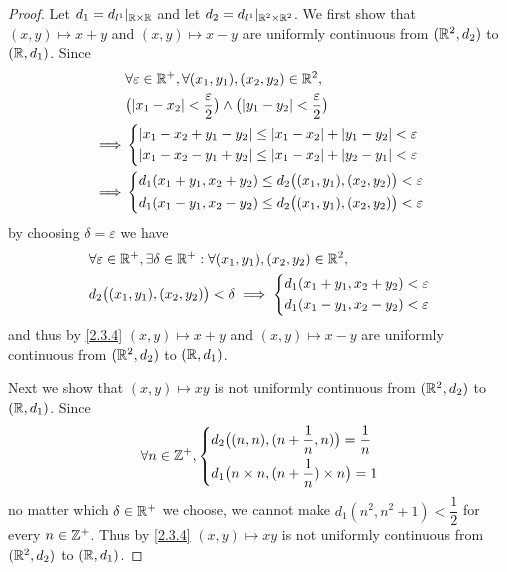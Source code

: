 \begin{proof}
  Let \(d_1 = d_{l^1}|_{\mathbb{R} \times \mathbb{R}}\) and let \(d_2 = d_{l^1}|_{\mathbb{R}^2 \times \mathbb{R}^2}\).
  We first show that \((x, y) \mapsto x + y\) and \((x, y) \mapsto x - y\) are uniformly continuous from \((\mathbb{R}^2, d_2)\) to \((\mathbb{R}, d_1)\).
  Since
  \begin{align*}
             & \forall \varepsilon \in \R^+, \forall (x_1, y_1), (x_2, y_2) \in \R^2,                                      \\
             & \big(\abs{x_1 - x_2} < \dfrac{\varepsilon}{2}\big) \land \big(\abs{y_1 - y_2} < \dfrac{\varepsilon}{2}\big) \\
    \implies & \begin{dcases}
                 \abs{x_1 - x_2 + y_1 - y_2} \leq \abs{x_1 - x_2} + \abs{y_1 - y_2} < \varepsilon \\
                 \abs{x_1 - x_2 - y_1 + y_2} \leq \abs{x_1 - x_2} + \abs{y_2 - y_1} < \varepsilon \\
               \end{dcases}                            \\
    \implies & \begin{dcases}
                 d_1(x_1 + y_1, x_2 + y_2) \leq d_2\big((x_1, y_1), (x_2, y_2)\big) < \varepsilon \\
                 d_1(x_1 - y_1, x_2 - y_2) \leq d_2\big((x_1, y_1), (x_2, y_2)\big) < \varepsilon
               \end{dcases}
  \end{align*}
  by choosing \(\delta = \varepsilon\) we have
  \begin{align*}
     & \forall \varepsilon \in \mathbb{R}^+, \exists \delta \in \mathbb{R}^+ : \forall (x_1, y_1), (x_2, y_2) \in \mathbb{R}^2, \\
     & d_2\big((x_1, y_1), (x_2, y_2)\big) < \delta \implies \begin{dcases}
                                                               d_1(x_1 + y_1, x_2 + y_2) < \varepsilon \\
                                                               d_1(x_1 - y_1, x_2 - y_2) < \varepsilon
                                                             \end{dcases}
  \end{align*}
  and thus by \cref{2.3.4} \((x, y) \mapsto x + y\) and \((x, y) \mapsto x - y\) are uniformly continuous from \((\mathbb{R}^2, d_2)\) to \((\mathbb{R}, d_1)\).

  Next we show that \((x, y) \mapsto xy\) is not uniformly continuous from \((\mathbb{R}^2, d_2)\) to \((\mathbb{R}, d_1)\).
  Since
  \[
    \forall n \in \mathbb{Z}^+, \begin{dcases}
      d_2\big((n, n), (n + \dfrac{1}{n}, n)\big) = \dfrac{1}{n} \\
      d_1\big(n \times n, (n + \dfrac{1}{n}) \times n\big) = 1
    \end{dcases}
  \]
  no matter which \(\delta \in \mathbb{R}^+\) we choose, we cannot make \(d_1(n^2, n^2 + 1) < \dfrac{1}{2}\) for every \(n \in \mathbb{Z}^+\).
  Thus by \cref{2.3.4} \((x, y) \mapsto xy\) is not uniformly continuous from \((\mathbb{R}^2, d_2)\) to \((\mathbb{R}, d_1)\).


\end{proof}
